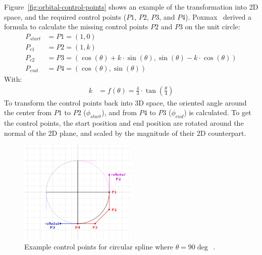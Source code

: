 Figure~\ref{fig:orbital-control-points} shows an example of the transformation into 2D space, and the required
control points ($P1$, $P2$, $P3$, and $P4$).
Poxmax~\cite{Poxmax2021} derived a formula to calculate the missing control points $P2$ and $P3$ on the unit circle:
\begin{equation}
    \label{eq:control-points}
    \begin{aligned}
        P_{start} &= P1 = (1, 0) \\
        P_{c1} &= P2 = (1, k) \\
        P_{c2} &= P3 = (\cos(\theta) + k \cdot \sin(\theta), \sin(\theta) - k \cdot \cos(\theta)) \\
        P_{end} &= P4 = (\cos(\theta), \sin(\theta))
    \end{aligned}
\end{equation}
With:
\begin{equation}
    \label{eq:control-points-factor}
    \begin{aligned}
        k &= f(\theta) = \frac{4}{3} \cdot \tan\left( \frac{\theta}{4} \right)
    \end{aligned}
\end{equation}
To transform the control points back into 3D space, the oriented angle around the center from $P1$ to $P2$
($\phi_{start}$), and from $P4$ to $P3$ ($\phi_{end}$) is calculated.
To get the control points, the start position and end position are rotated around the normal of the 2D plane, and
scaled by the magnitude of their 2D counterpart.

\begin{figure}[h]
    \centering
    \includegraphics[width=0.5\textwidth]{content/4_3_autoNavigation/img/ControlPointsReflected}
    \caption{Example control points for circular spline where $\theta = 90\deg$~\cite{Poxmax2021}.}
    \label{fig:orbital-reflected-points}
\end{figure}

